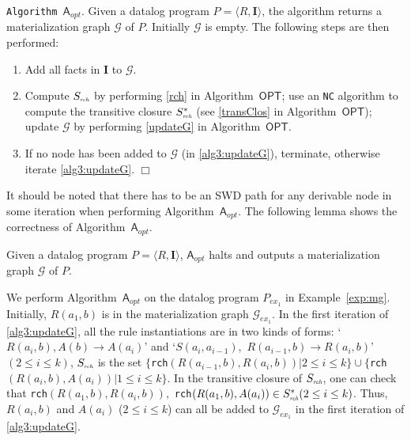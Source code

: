\documentclass[final,1p,times]{elsarticle}
\begin{document}
\noindent\texttt{Algorithm~$\mathsf{A}_{opt}$}. Given a datalog program $P=\langle R, \textbf{I}\rangle$, the algorithm
returns a materialization graph $\mathcal{G}$ of $P$. Initially $\mathcal{G}$ is empty. The following steps are then performed:
\begin{enumerate}[leftmargin=8ex,label=(\textit{Step \arabic*}),ref=Step~\arabic*]
\item Add all facts in $\textbf{I}$ to $\mathcal{G}$.\label{alg3:addFacts}
\item Compute $S_{\textit{\tiny rch}}$ by performing \ref{rch} in Algorithm~$\mathsf{OPT}$; use an \texttt{NC}
    algorithm to compute the transitive closure $S^*_{\textit{\tiny rch}}$ (see \ref{transClos} in Algorithm~$\mathsf{OPT}$);
    update $\mathcal{G}$ by performing \ref{updateG}  in Algorithm~$\mathsf{OPT}$.\label{alg3:updateG}
\item If no node has been added to $\mathcal{G}$ (in \ref{alg3:updateG}), terminate,
    otherwise iterate \ref{alg3:updateG}. \label{alg3:halt}\hfill$\Box$
\end{enumerate}

It should be noted that there has to be an SWD path for any derivable node in some iteration when performing
Algorithm~$\mathsf{A}_{opt}$.
The following lemma shows the correctness of Algorithm~$\mathsf{A}_{opt}$.

\begin{lemma}\label{lemma:a3}
Given a datalog program $P=\langle R, \textbf{I}\rangle$,
$\mathsf{A}_{opt}$ halts and outputs a materialization graph $\mathcal{G}$ of $P$.
\end{lemma}

\begin{example}\label{exp:opt}
We perform Algorithm~$\mathsf{A}_{opt}$ on the datalog program $P_{ex_1}$ in Example~\ref{exp:mg}.
Initially, $R(a_1,b)$ is in the materialization graph $\mathcal{G}_{ex_1}$.
In the first iteration of \ref{alg3:updateG}, all the rule instantiations are in two kinds of forms:
`$R(a_i,b),A(b)\rightarrow A(a_i)$' and `$S(a_i,a_{i-1}),$ $R(a_{i-1},b)\rightarrow R(a_i,b)$' $(2\leq i\leq k)$,
$S_{\textit{\tiny rch}}$ is the set $\{$\texttt{rch}$(R(a_{i-1},b), R(a_i,b))|2\leq i\leq k\}
\cup\{$\texttt{rch}$(R(a_i,b), A(a_i))|1\leq i\leq k\}$.
In the transitive closure of $S_{\textit{\tiny rch}}$,
one can check that \texttt{rch}$(R(a_1,b), R(a_i,b)),$
\texttt{rch}$(R(a_1,b), A(a_i))\in S^*_{\textit{\tiny rch}}(2\leq i\leq k)$.
Thus, $R(a_i,b)$ and $A(a_i)$ ($2\leq i\leq k$) can all be added to $\mathcal{G}_{ex_1}$
in the first iteration of \ref{alg3:updateG}.
\end{example}
\end{document}
